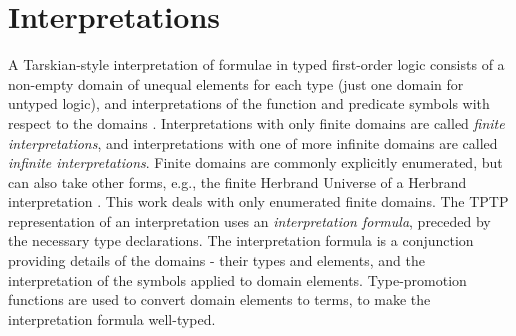 \documentclass[letterpaper]{article}
\newcommand{\smalltt}[1]{\small \texttt{#1}}
\newenvironment{packed_itemize}{
\vspace*{-0.2em}
\begin{itemize}
\setlength{\partopsep}{0pt}
\setlength{\itemsep}{1pt}
\setlength{\parskip}{0pt}
\setlength{\parsep}{0pt}
}{\end{itemize}}
\begin{document}
{\section{Interpretations}
\label{Interpretations}

A Tarskian-style interpretation \cite{TV56} of formulae in typed first-order logic consists of a 
non-empty domain of unequal elements for each type (just one domain for untyped logic), and 
interpretations of the function and predicate symbols with respect to the domains 
\cite{Gal15}.
Interpretations with only finite domains are called {\em finite interpretations}, and
interpretations with one of more infinite domains are called {\em infinite interpretations}.
Finite domains are commonly explicitly enumerated, but can also take other forms, e.g., the 
finite Herbrand Universe of a Herbrand interpretation \cite{Her30}.
This work deals with only enumerated finite domains.
The TPTP representation of an interpretation uses an {\em interpretation formula}, preceded by 
the necessary type declarations.
The interpretation formula is a conjunction providing details of the domains - their types and 
elements, and the interpretation of the symbols applied to domain elements.
Type-promotion functions are used to convert domain elements to terms, to make the
interpretation formula well-typed.
}
\end{document}
